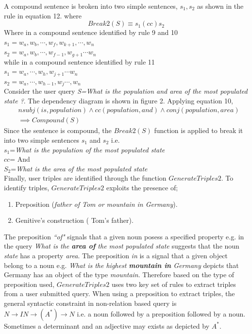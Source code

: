 \documentclass[review]{elsarticle}
\begin{document}
A compound sentence is broken into two  simple sentences,   $s_1, s_2$ as shown in the rule in equation 12. where
\begin{equation}
Break2(S)\equiv s_1(cc)s_2
\end{equation}
Where in a compound sentence identified by rule 9 and 10\\
$s_1=w_a,w_b,\cdots ,w_f,w_{k+1},\cdots,w_n$\\
$s_2=w_a,w_b,\cdots,w_{f-1},w_{g+1}\cdots w_n$\\
while in a compound sentence identified by rule 11\\
$s_1=w_a,\cdots,w_h,w_{j+1}\cdots w_n$ \\
$s_2=w_a,\cdots,w_{h-1}, w_j\cdots,w_n$\\
Consider the user query  \textit{S=What is the population and area of the most populated state ?}. The dependency diagram is shown in figure 2.  Applying equation 10,
\begin{equation*}
\begin{split}
 &nsubj(is,population)\land cc(population, and)\land conj(population,area)\\
 &\implies Compound(S)
 \end{split}
 \end{equation*}
Since the sentence is compound, the $ Break2(S)$ function is applied  to break it into two simple sentences $s_1$ and $s_2$ i.e.\\
$s_1$=\textit{What is the population of the most populated state}\\
$cc$= And\\
$S_2$=\textit{What is the area of the most populated state}\\
Finally, user triples  are identified through the function $GenerateTriples2$.  To identify triples, $GenerateTriples2$  exploits the presence of;
\begin{enumerate}
\item Preposition (\textit{father of Tom or mountain in Germany}).
\item Genitive's construction ( Tom's father).
\end{enumerate} 
The preposition \textit{ ``of"} signals that a given noun posess a specified property e.g. in the query \textit{What is the \textbf{area of} the most populated state} suggests that the noun
\textit{state} has a property \textit{ area}. The preposition \textit{in} is a signal that  a given object belong to a noun e.g. \textit{What is the highest \textbf{mountain in} Germany} depicts that Germany has an object of the type \textit{mountain}. Therefore based on the type of preposition used, $GenerateTriples2$ uses two key set of rules to extract triples from a user submitted query. When using a preposition to extract triples, the  general syntactic constraint  in non-relation based query is \textit{$N \rightarrow  IN \rightarrow (A^{*})\rightarrow N$} i.e. a noun followed by a preposition followed by a noun. Sometimes a determinant and an adjective may exists as depicted by $A^{*}$.
\end{document}
